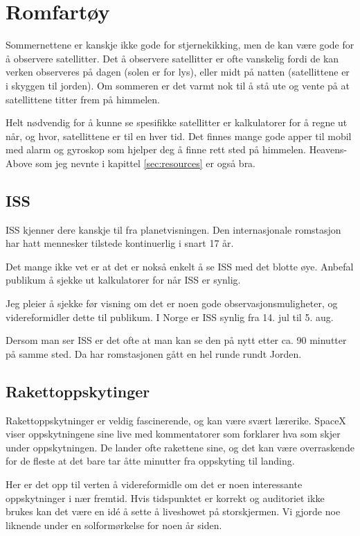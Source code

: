 \documentclass[../SommerstjernerA4.tex]{subfiles}
\begin{document}
\section{Romfartøy}
Sommernettene er kanskje ikke gode for stjernekikking, men de kan være gode for å observere satellitter. Det å observere satellitter er ofte vanskelig fordi de kan verken observeres på dagen (solen er for lys), eller midt på natten (satellittene er i skyggen til jorden). Om sommeren er det varmt nok til å stå ute og vente på at satellittene titter frem på himmelen.

Helt nødvendig for å kunne se spesifikke satellitter er kalkulatorer for å regne ut når, og hvor, satellittene er til en hver tid. Det finnes mange gode apper til mobil med alarm og gyroskop som hjelper deg å finne rett sted på himmelen. Heavens-Above som jeg nevnte i kapittel \ref{sec:resources} er også bra.

\subsection{ISS}
ISS kjenner dere kanskje til fra planetvisningen. Den internasjonale romstasjon har hatt mennesker tilstede	kontinuerlig i snart 17 år.

Det mange ikke vet er at det er nokså enkelt å se ISS med det blotte øye. Anbefal publikum å sjekke ut kalkulatorer for når ISS er synlig.

Jeg pleier å sjekke før visning om det er noen gode observasjonsmuligheter, og videreformidler dette til publikum. I Norge er ISS synlig fra 14. jul til 5. aug.

Dersom man ser ISS er det ofte at man kan se den på nytt etter ca. 90 minutter på samme sted. Da har romstasjonen gått en hel runde rundt Jorden.

\subsection{Rakettoppskytinger}
Rakettoppskytninger er veldig fascinerende, og kan være svært lærerike. SpaceX viser oppskytningene sine live med kommentatorer som forklarer hva som skjer under oppskytningen. De lander ofte rakettene sine, og det kan være overraskende for de fleste at det bare tar åtte minutter fra oppskyting til landing.

Her er det opp til verten å videreformidle om det er noen interessante oppskytninger i nær fremtid. Hvis tidspunktet er korrekt og auditoriet ikke brukes kan det være en idé å sette å liveshowet på storskjermen. Vi gjorde noe liknende under en solformørkelse for noen år siden.
\end{document}

